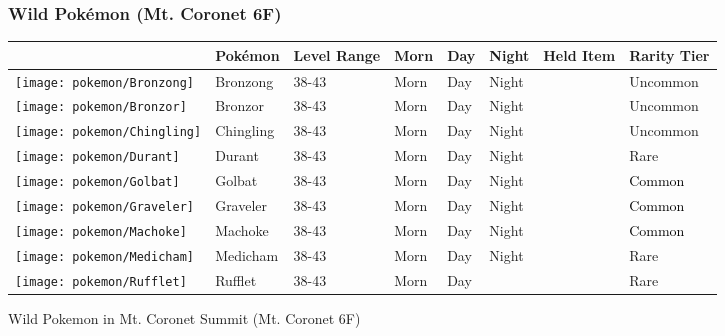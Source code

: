 \subsubsection{Wild Pokémon (Mt. Coronet 6F)}%
\label{ssubsec:WildPokmon(Mt.Coronet6F)}%
\begin{longtable}{||l l l l l l l l||}%
\hline%
\rowcolor{gray}%
&Pokémon&Level Range&Morn&Day&Night&Held Item&Rarity Tier\\%
\hline%
\endhead%
\hline%
\rowcolor{gray}%
\texttt{[image: pokemon/Bronzong]}&Bronzong&38{-}43&Morn&Day&Night&&\textcolor{OliveGreen}{%
Uncommon%
}\\%
\hline%
\rowcolor{gray}%
\texttt{[image: pokemon/Bronzor]}&Bronzor&38{-}43&Morn&Day&Night&&\textcolor{OliveGreen}{%
Uncommon%
}\\%
\hline%
\rowcolor{gray}%
\texttt{[image: pokemon/Chingling]}&Chingling&38{-}43&Morn&Day&Night&&\textcolor{OliveGreen}{%
Uncommon%
}\\%
\hline%
\rowcolor{gray}%
\texttt{[image: pokemon/Durant]}&Durant&38{-}43&Morn&Day&Night&&\textcolor{RedOrange}{%
Rare%
}\\%
\hline%
\rowcolor{gray}%
\texttt{[image: pokemon/Golbat]}&Golbat&38{-}43&Morn&Day&Night&&\textcolor{black}{%
Common%
}\\%
\hline%
\rowcolor{gray}%
\texttt{[image: pokemon/Graveler]}&Graveler&38{-}43&Morn&Day&Night&&\textcolor{black}{%
Common%
}\\%
\hline%
\rowcolor{gray}%
\texttt{[image: pokemon/Machoke]}&Machoke&38{-}43&Morn&Day&Night&&\textcolor{black}{%
Common%
}\\%
\hline%
\rowcolor{gray}%
\texttt{[image: pokemon/Medicham]}&Medicham&38{-}43&Morn&Day&Night&&\textcolor{RedOrange}{%
Rare%
}\\%
\hline%
\rowcolor{gray}%
\texttt{[image: pokemon/Rufflet]}&Rufflet&38{-}43&Morn&Day&&&\textcolor{RedOrange}{%
Rare%
}\\%
\hline%
\end{longtable}%
\caption{Wild Pokemon in Mt. Coronet Summit (Mt. Coronet 6F)}